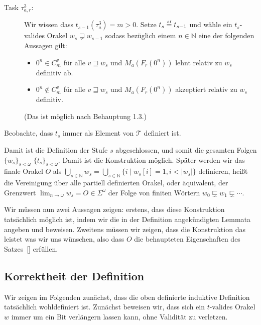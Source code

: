 \begin{description}
    \item[Task $\tau^3_{a,r}$:] Wir wissen dass $t_{s-1}(\tau^3_{a})=m>0$. Setze $t_s\stackrel{\text{\smash{\tiny df}}}{=} t_{s-1}$ und wähle ein $t_s$-valides Orakel $w_s\sqsupsetneq w_{s-1}$ sodass bezüglich einem $n\in\mathbb N$ eine der folgenden Aussagen gilt:
        \begin{itemize}[nosep,endpenalty=10000]
            \item $0^n\in C_m^v$ für alle $v\sqsupseteq w_s$ und $M_a(F_r(0^n))$ lehnt relativ zu $w_s$ definitiv ab.
            \item $0^n\not\in C_m^v$ für alle $v\sqsupseteq w_s$ und $M_a(F_r(0^n))$ akzeptiert relativ zu $w_s$ definitiv.
        \end{itemize} (Das ist möglich nach Behauptung 1.3.)
\end{description}

Beobachte, dass $t_s$ immer als Element von $\mathcal T$ definiert ist.

Damit ist die Definition der Stufe $s$ abgeschlossen, und somit die gesamten Folgen $\{w_s\}_{s<\omega}$ $\{t_s\}_{s<\omega}$.
Damit ist die Konstruktion möglich. Später werden wir das finale Orakel $O$ als $\bigcup_{s\in\mathbb N} w_s = \bigcup_{s\in\mathbb N} \{ i \mid w_s[i]=1, i<|w_s|\} $ definieren, heißt die Vereinigung über alle partiell definierten Orakel, oder äquivalent, der Grenzwert $\lim_{n\to\omega} w_s = O\in\Sigma^\omega$ der Folge von finiten Wörtern $w_0\sqsubsetneq  w_1\sqsubsetneq \cdots$.

Wir müssen nun zwei Aussagen zeigen: erstens, dass diese Konstruktion tatsächlich möglich ist, indem wir die in der Definition angekündigten Lemmata angeben und beweisen.
Zweitens müssen wir zeigen, dass die Konstruktion das leistet was wir uns wünschen, also dass $O$ die behaupteten Eigenschaften des Satzes~\ref{} erfüllen.

\subsection*{Korrektheit der Definition}

Wir zeigen im Folgenden zunächst, dass die oben definierte induktive Definition tatsächlich wohldefiniert ist.
Zunächst beweisen wir, dass sich ein $t$-valides Orakel $w$ immer um ein Bit verlängern lassen kann, ohne Validität zu verletzen.

